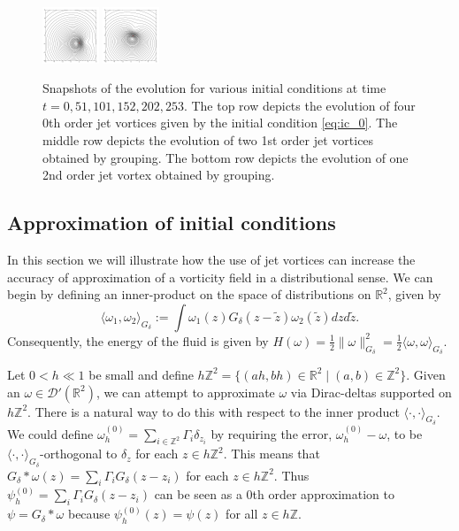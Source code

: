 \documentclass[12pt]{amsart}
\newcommand{\R}{\ensuremath{\mathbb{R}}}
\theoremstyle{remark}
\begin{document}
\begin{figure}[h!]
	\includegraphics[width=0.15\textwidth]{./images/grouping_frames/order_2_time_202}
	\includegraphics[width=0.15\textwidth]{./images/grouping_frames/order_2_time_253}
	\caption{Snapshots of the evolution for various initial conditions at time $t=0,51,101,152,202,253$.
		The top row depicts the evolution of four 0th order jet vortices given by the initial condition \eqref{eq:ic_0}.
		The middle row depicts the evolution of two 1st order jet vortices obtained by grouping.
		The bottom row depicts the evolution of one 2nd order jet vortex obtained by grouping.
		}
	\label{fig:grouping}
\end{figure}


\subsection{Approximation of initial conditions}
\label{sec:approximation}
In this section we will illustrate how the use of jet vortices can increase the accuracy of approximation of a vorticity field in a distributional sense.
We can begin by defining an inner-product on the space of distributions on $\R^2$, given by
\[
	\langle \omega_1 , \omega_2 \rangle_{G_\delta} := \int \omega_1(z) G_\delta (z - \tilde{z}) \omega_2(\tilde{z}) dz d\tilde{z}.
\]
Consequently, the energy of the fluid is given by $H(\omega) = \frac{1}{2} \|\omega\|^2_{G_\delta} = \frac{1}{2} \langle \omega,\omega\rangle_{G_\delta}$.

Let $0 < h \ll 1$ be small and define $h \mathbb{Z}^2 = \{ (ah,bh) \in \R^2 \mid (a,b) \in \mathbb{Z}^2 \}$.
Given an $\omega \in \mathcal{D}'(\R^2)$, we can attempt to approximate $\omega$ via Dirac-deltas supported on $h \mathbb{Z}^2$.
There is a natural way to do this with respect to the inner product $\langle \cdot , \cdot \rangle_{G_\delta}$.
We could define $\omega_h^{(0)} = \sum_{i \in \mathbb{Z}^2} \Gamma_i \delta_{z_i}$ by requiring the error, $\omega_h^{(0)} - \omega$, to be $\langle \cdot , \cdot \rangle_{G_\delta}$-orthogonal to $\delta_z$ for each $z \in h \mathbb{Z}^2$.
This means that $G_\delta *\omega(z) =  \sum_i \Gamma_i G_\delta (z-z_i)$ for each $z \in h\mathbb{Z}^2$.
Thus $\psi_h^{(0)} = \sum_i \Gamma_i G_\delta (z-z_i)$ can be seen as a $0$th order approximation to $\psi = G_\delta *\omega$
because $\psi_h^{(0)}(z) = \psi(z)$ for all $z \in h\mathbb{Z}$.
 
\end{document}
